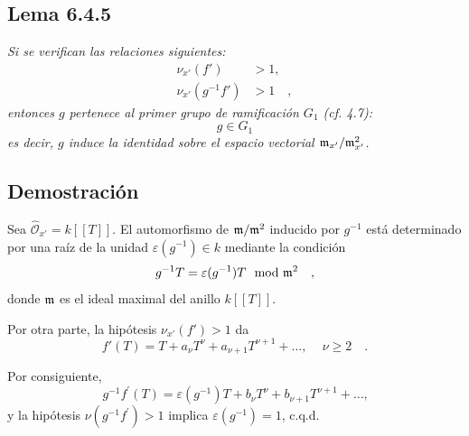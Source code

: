 \subsection*{Lema 6.4.5}
\emph{Si se verifican las relaciones siguientes:}
\begin{align*}
\nu_{x'}(f') &> 1 \text{,} \\
\nu_{x'}(g^{-1}f') &> 1 \quad ,
\end{align*}
\emph{entonces $g$ pertenece al primer grupo de ramificación $G_1$ (cf. 4.7):}
\[
g \in G_1
\]
\emph{es decir, $g$ induce la identidad sobre el espacio vectorial $\mathfrak m_{x'}/\mathfrak m_{x'}^2$.}

\subsection*{Demostración}
Sea $\widehat{\mathcal{O}}_{x'} = k[[T]]$. El automorfismo de $\mathfrak m/\mathfrak m^2$ inducido por $g^{-1}$ está determinado por una raíz de la unidad $\varepsilon(g^{-1}) \in k$ mediante la condición
\[
g^{-1}T = \varepsilon(g^{-1})T \mod {\mathfrak m}^2 \quad ,
\]
donde $\mathfrak m$ es el ideal maximal del anillo $k[[T]]$.

Por otra parte, la hipótesis $\nu_{x'}(f') > 1$ da
\[
f'(T) = T + a_\nu T^\nu + a_{\nu+1} T^{\nu+1} + \ldots \text{, } \quad \nu \geq 2 \quad .
\]

Por consiguiente,
\[
g^{-1}f^{\prime}(T) = \varepsilon(g^{-1})T + b_\nu T^\nu + b_{\nu+1} T^{\nu+1} + \ldots \text{,}
\]
y la hipótesis $\nu(g^{-1}f^{\prime}) > 1$ implica $\varepsilon(g^{-1}) = 1$, c.q.d.
